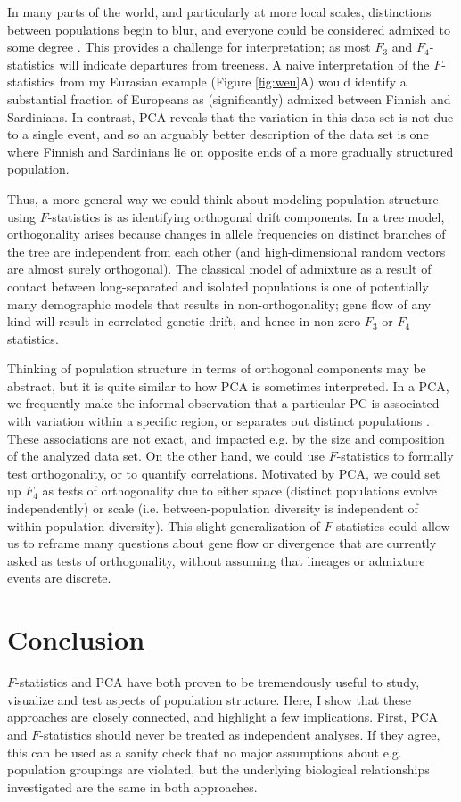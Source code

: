 \documentclass[12pt,fullpage, a4paper]{article}
\begin{document}
In many parts of the world, and particularly at more local scales, distinctions between populations begin to blur, and everyone could be considered  admixed to some degree \citep{pickrell2014}. This provides a challenge for interpretation; as most $F_3$ and $F_4$-statistics will indicate departures from treeness. A naive interpretation of the $F$-statistics from my Eurasian example  (Figure \ref{fig:weu}A) would identify a substantial fraction of Europeans as (significantly) admixed between Finnish and Sardinians. In contrast, PCA reveals that the variation in this data set is not due to a single event, and so an arguably better description of the data set is one where Finnish and Sardinians lie on opposite ends of a more gradually structured population. 

Thus, a more general way we could think about modeling population structure using $F$-statistics is as identifying orthogonal drift components. In a tree model, orthogonality arises  because changes in allele frequencies on distinct branches of the tree are independent from each other (and high-dimensional random vectors are almost surely orthogonal).  The classical model of admixture as a result of contact between long-separated and isolated populations is one of potentially many demographic models that results in non-orthogonality; gene flow of any kind will result in correlated genetic drift, and hence in non-zero $F_3$ or $F_4$-statistics.

Thinking of population structure in terms of orthogonal components may be abstract, but it is quite similar to how PCA is sometimes interpreted. In a PCA, we frequently make the informal observation that a particular PC is associated with variation within a specific region, or separates out distinct populations \citep{cavalli-sforza1994}. These associations are not exact, and impacted e.g. by the size and composition of the analyzed data set. On the other hand, we could use $F$-statistics to formally test orthogonality, or to quantify correlations.  Motivated by PCA, we could set up $F_4$ as tests of orthogonality due to either space (distinct populations evolve independently) or scale (i.e. between-population diversity is independent of within-population diversity). This slight generalization of $F$-statistics could allow us to reframe many questions about gene flow or divergence that are currently asked as tests of orthogonality, without assuming that lineages or admixture events are discrete.

\section{Conclusion}
$F$-statistics and PCA have both proven to be tremendously useful to study, visualize and test aspects of population structure. Here, I show that these approaches are closely connected, and highlight a few implications. First, PCA and $F$-statistics should never be treated as independent analyses. If they agree, this can be used as a sanity check that no major assumptions about e.g. population groupings are violated, but the underlying biological relationships investigated are the same in both approaches.  
\end{document}
